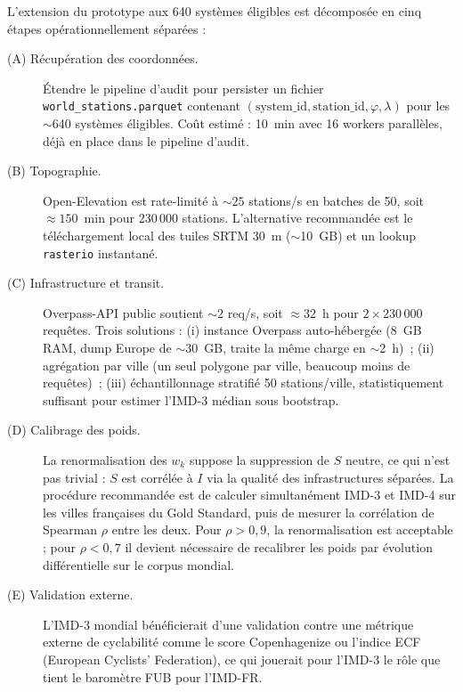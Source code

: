 \documentclass[11pt,a4paper]{article}
\begin{document}
L'extension du prototype aux 640 systèmes éligibles est
décomposée en cinq étapes opérationnellement séparées :

\begin{description}
  \item[(A) Récupération des coordonnées.] Étendre le pipeline
        d'audit pour persister un fichier
        \texttt{world\_stations.parquet} contenant
        $(\text{system\_id}, \text{station\_id},
        \varphi, \lambda)$ pour les $\sim$640 systèmes
        éligibles. Coût estimé : 10~min avec 16 workers
        parallèles, déjà en place dans le pipeline d'audit.
  \item[(B) Topographie.] Open-Elevation est rate-limité à
        $\sim 25$ stations/s en batches de 50, soit
        $\approx 150$~min pour 230\,000 stations. L'alternative
        recommandée est le téléchargement local des tuiles
        SRTM 30~m ($\sim$10~GB) et un lookup
        \texttt{rasterio} instantané.
  \item[(C) Infrastructure et transit.] Overpass-API public
        soutient $\sim 2$ req/s, soit $\approx 32$~h pour
        $2 \times 230\,000$ requêtes. Trois solutions :
        (i) instance Overpass auto-hébergée (8~GB RAM,
        dump Europe de $\sim$30~GB, traite la même charge en
        $\sim$2~h)~; (ii) agrégation par ville (un seul
        polygone par ville, beaucoup moins de requêtes)~;
        (iii) échantillonnage stratifié 50 stations/ville,
        statistiquement suffisant pour estimer l'IMD-3 médian
        sous bootstrap.
  \item[(D) Calibrage des poids.] La renormalisation des
        $w_k$ suppose la suppression de $S$ neutre, ce qui
        n'est pas trivial : $S$ est corrélée à $I$ via la
        qualité des infrastructures séparées. La procédure
        recommandée est de calculer simultanément IMD-3 et
        IMD-4 sur les villes françaises du Gold Standard, puis
        de mesurer la corrélation de Spearman $\rho$ entre les
        deux. Pour $\rho > 0{,}9$, la renormalisation est
        acceptable ; pour $\rho < 0{,}7$ il devient nécessaire
        de recalibrer les poids par évolution différentielle
        sur le corpus mondial.
  \item[(E) Validation externe.] L'IMD-3 mondial bénéficierait
        d'une validation contre une métrique externe de
        cyclabilité comme le score Copenhagenize ou l'indice
        ECF (European Cyclists' Federation), ce qui jouerait
        pour l'IMD-3 le rôle que tient le baromètre FUB pour
        l'IMD-FR.
\end{description}
\end{document}
